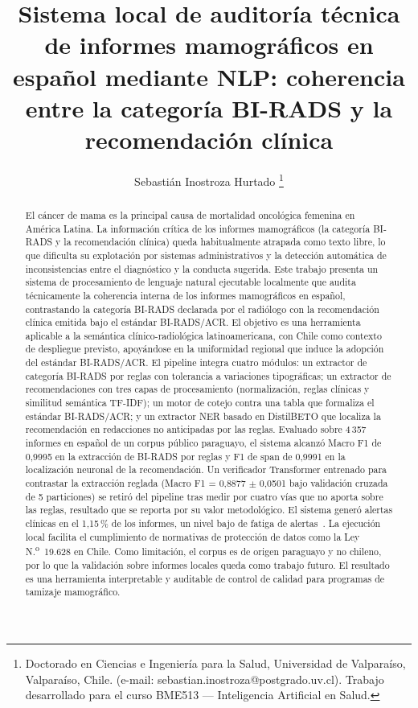 \documentclass[10pt,journal,a4paper]{IEEEtran}
\title{Sistema local de auditor\'ia t\'ecnica de informes mamogr\'aficos en espa\~nol mediante NLP: coherencia entre la categor\'ia BI-RADS y la recomendaci\'on cl\'inica}
\author{
    Sebasti\'an Inostroza Hurtado
    \thanks{Doctorado en Ciencias e Ingenier\'ia para la Salud, Universidad de Valpara\'iso, Valpara\'iso, Chile. (e-mail: sebastian.inostroza@postgrado.uv.cl). Trabajo desarrollado para el curso BME513 --- Inteligencia Artificial en Salud.}
}
\begin{document}
\maketitle

\begin{abstract}
El c\'ancer de mama es la principal causa de mortalidad oncol\'ogica femenina en Am\'erica Latina. La informaci\'on cr\'itica de los informes mamogr\'aficos (la categor\'ia BI-RADS y la recomendaci\'on cl\'inica) queda habitualmente atrapada como texto libre, lo que dificulta su explotaci\'on por sistemas administrativos y la detecci\'on autom\'atica de inconsistencias entre el diagn\'ostico y la conducta sugerida. Este trabajo presenta un sistema de procesamiento de lenguaje natural ejecutable localmente que audita t\'ecnicamente la coherencia interna de los informes mamogr\'aficos en espa\~nol, contrastando la categor\'ia BI-RADS declarada por el radi\'ologo con la recomendaci\'on cl\'inica emitida bajo el est\'andar BI-RADS/ACR. El objetivo es una herramienta aplicable a la sem\'antica cl\'inico-radiol\'ogica latinoamericana, con Chile como contexto de despliegue previsto, apoy\'andose en la uniformidad regional que induce la adopci\'on del est\'andar BI-RADS/ACR. El pipeline integra cuatro m\'odulos: un extractor de categor\'ia BI-RADS por reglas con tolerancia a variaciones tipogr\'aficas; un extractor de recomendaciones con tres capas de procesamiento (normalizaci\'on, reglas cl\'inicas y similitud sem\'antica TF-IDF); un motor de cotejo contra una tabla que formaliza el est\'andar BI-RADS/ACR; y un extractor NER basado en DistilBETO que localiza la recomendaci\'on en redacciones no anticipadas por las reglas. Evaluado sobre 4\,357 informes en espa\~nol de un corpus p\'ublico paraguayo, el sistema alcanz\'o Macro F1 de 0,9995 en la extracci\'on de BI-RADS por reglas y F1 de span de 0,9991 en la localizaci\'on neuronal de la recomendaci\'on. Un verificador Transformer entrenado para contrastar la extracci\'on reglada (Macro F1 = 0,8877 $\pm$ 0,0501 bajo validaci\'on cruzada de 5 particiones) se retir\'o del pipeline tras medir por cuatro v\'ias que no aporta sobre las reglas, resultado que se reporta por su valor metodol\'ogico. El sistema gener\'o alertas cl\'inicas en el 1,15\,\% de los informes, un nivel bajo de fatiga de alertas~\cite{ancker2017effects}. La ejecuci\'on local facilita el cumplimiento de normativas de protecci\'on de datos como la Ley N.\textsuperscript{o}~19.628 en Chile. Como limitaci\'on, el corpus es de origen paraguayo y no chileno, por lo que la validaci\'on sobre informes locales queda como trabajo futuro. El resultado es una herramienta interpretable y auditable de control de calidad para programas de tamizaje mamogr\'afico.
\end{abstract}
\end{document}
